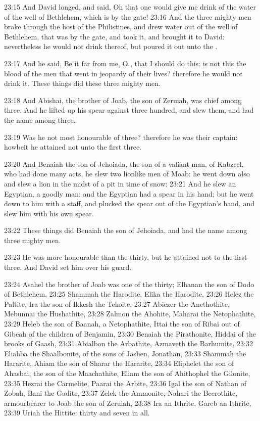 23:15 And David longed, and said, Oh that one would give me drink of
the water of the well of Bethlehem, which is by the gate!  23:16 And
the three mighty men brake through the host of the Philistines, and
drew water out of the well of Bethlehem, that was by the gate, and
took it, and brought it to David: nevertheless he would not drink
thereof, but poured it out unto the \LORD.

23:17 And he said, Be it far from me, O \LORD, that I should do this:
is not this the blood of the men that went in jeopardy of their lives?
therefore he would not drink it. These things did these three mighty
men.

23:18 And Abishai, the brother of Joab, the son of Zeruiah, was chief
among three. And he lifted up his spear against three hundred, and
slew them, and had the name among three.

23:19 Was he not most honourable of three? therefore he was their
captain: howbeit he attained not unto the first three.

23:20 And Benaiah the son of Jehoiada, the son of a valiant man, of
Kabzeel, who had done many acts, he slew two lionlike men of Moab: he
went down also and slew a lion in the midst of a pit in time of snow:
23:21 And he slew an Egyptian, a goodly man: and the Egyptian had a
spear in his hand; but he went down to him with a staff, and plucked
the spear out of the Egyptian's hand, and slew him with his own spear.

23:22 These things did Benaiah the son of Jehoiada, and had the name
among three mighty men.

23:23 He was more honourable than the thirty, but he attained not to
the first three. And David set him over his guard.

23:24 Asahel the brother of Joab was one of the thirty; Elhanan the
son of Dodo of Bethlehem, 23:25 Shammah the Harodite, Elika the
Harodite, 23:26 Helez the Paltite, Ira the son of Ikkesh the Tekoite,
23:27 Abiezer the Anethothite, Mebunnai the Hushathite, 23:28 Zalmon
the Ahohite, Maharai the Netophathite, 23:29 Heleb the son of Baanah,
a Netophathite, Ittai the son of Ribai out of Gibeah of the children
of Benjamin, 23:30 Benaiah the Pirathonite, Hiddai of the brooks of
Gaash, 23:31 Abialbon the Arbathite, Azmaveth the Barhumite, 23:32
Eliahba the Shaalbonite, of the sons of Jashen, Jonathan, 23:33
Shammah the Hararite, Ahiam the son of Sharar the Hararite, 23:34
Eliphelet the son of Ahasbai, the son of the Maachathite, Eliam the
son of Ahithophel the Gilonite, 23:35 Hezrai the Carmelite, Paarai the
Arbite, 23:36 Igal the son of Nathan of Zobah, Bani the Gadite, 23:37
Zelek the Ammonite, Nahari the Beerothite, armourbearer to Joab the
son of Zeruiah, 23:38 Ira an Ithrite, Gareb an Ithrite, 23:39 Uriah
the Hittite: thirty and seven in all.

